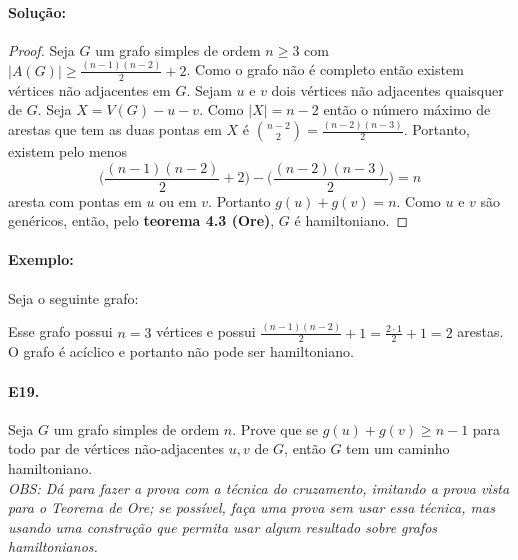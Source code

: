 \documentclass[11pt,a4paper,notitlepage]{exam}
\begin{document}
\paragraph{Solução:}
\begin{proof}
  Seja $G$ um grafo simples de ordem $n \geq 3$ com $|A(G)| \geq \frac{(n-1)(n-2)}{2}+2$. Como o grafo não é completo então existem vértices não adjacentes em $G$. Sejam $u$ e $v$ dois vértices não adjacentes quaisquer de $G$. Seja $X = V(G) - u - v$. Como $|X| = n-2$ então o número máximo de arestas que tem as duas pontas em $X$ é ${n-2 \choose 2} = \frac{(n-2)(n-3)}{2}$. Portanto, existem pelo menos
  $$
    \bigg(\frac{(n-1)(n-2)}{2} + 2\bigg) -  \bigg(\frac{(n-2)(n-3)}{2}\bigg) = n
  $$
  aresta com pontas em $u$ ou em $v$. Portanto $g(u) + g(v) = n$. Como $u$ e $v$ são genéricos, então, pelo \textbf{teorema 4.3 (Ore)}, $G$ é hamiltoniano.
\end{proof}
\paragraph{Exemplo: } Seja o seguinte grafo:
\begin{center}
\end{center}
Esse grafo possui $n = 3$ vértices e possui $\frac{(n-1)(n-2)}{2} + 1 = \frac{2\cdot 1}{2} + 1 = 2$ arestas. O grafo é acíclico e portanto não pode ser hamiltoniano.

\paragraph{E19. } Seja $G$ um grafo simples de ordem $n$. Prove que se $g(u) + g(v) \geq n - 1$ para todo par de vértices não-adjacentes $u, v$ de $G$, então $G$ tem um caminho hamiltoniano.\medskip\\
\textit{OBS: Dá para fazer a prova com a técnica do cruzamento, imitando a prova vista para o Teorema de Ore; se possível, faça uma prova sem usar essa técnica, mas usando uma construção que permita usar algum resultado sobre grafos hamiltonianos.}
\end{document}
